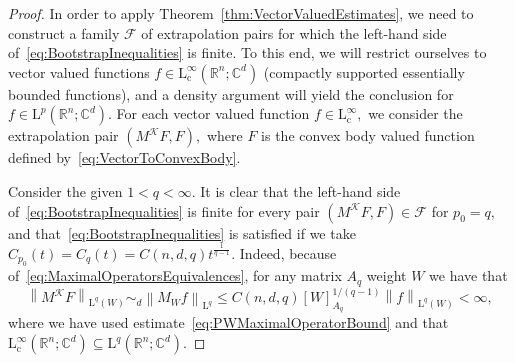 \documentclass{article}
\theoremstyle{definition}
\theoremstyle{remark}
\numberwithin{equation}{section}
\newcommand{\norm}[2]{\left\|{#1}\right\|_{{#2}}}
\newcommand{\cF}{\mathcal{F}}
\newcommand{\cK}{\mathcal{K}}
\newcommand{\reals}{\mathbb{R}}
\newcommand{\complex}{\mathbb{C}}
\newcommand{\Lp}[1]{\mathrm{L}^{#1}}
\newcommand{\1}{\mathbf{1}}
\begin{document}
    \begin{proof}
        In order to apply Theorem~\ref{thm:VectorValuedEstimates},
        we need to construct a family $\cF$ of extrapolation pairs for which
        the left-hand side of~\eqref{eq:BootstrapInequalities} is finite.
        To this end, we will restrict ourselves to vector valued functions $f \in \Lp{\infty}_\mathrm{c}(\reals^n; \complex^d)$
        (compactly supported essentially bounded functions),
        and a density argument will yield the conclusion for $f \in \Lp{p}(\reals^n; \complex^d).$
        For each vector valued function $f \in \Lp{\infty}_\mathrm{c},$ we consider the extrapolation pair $(M^\cK F,F),$
        where $F$ is the convex body valued function defined by~\eqref{eq:VectorToConvexBody}.

        Consider the given $1 < q < \infty.$
        It is clear that the left-hand side of~\eqref{eq:BootstrapInequalities} is finite for every pair $(M^\cK F,F) \in \cF$ for $p_0 = q,$
        and that~\eqref{eq:BootstrapInequalities} is satisfied if we take $C_{p_0}(t) = C_q(t) = C(n,d,q) t^{\frac{1}{q-1}}.$
        Indeed, because of~\eqref{eq:MaximalOperatorsEquivalences}, for any matrix $A_q$ weight $W$ we have that
        \begin{equation*}
                \norm{M^\cK F}{\Lp{q}(W)} \sim_d \norm{M_W f}{\Lp{q}}
                \leq C(n,d,q) [W]_{A_q}^{1/(q-1)} \norm{f}{\Lp{q}(W)} < \infty,
        \end{equation*}
        where we have used estimate~\eqref{eq:PWMaximalOperatorBound} and
        that $\Lp{\infty}_\mathrm{c}(\reals^n; \complex^d) \subseteq \Lp{q}(\reals^n; \complex^d).$


\end{proof}
\end{document}
